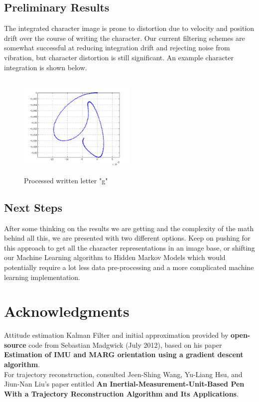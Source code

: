 \documentclass{article}
\begin{document}
\subsection{Preliminary Results}
The integrated character image is prone to distortion due to velocity and position drift over the course of writing the character. Our current filtering schemes are somewhat successful at reducing integration drift and rejecting noise from vibration, but character distortion is still significant. An example character integration is shown below.
\begin{figure}[H]
\centering
    \includegraphics[width=0.5\textwidth, height= 5cm]{g.png}
    \caption{Processed written letter "g"}
\end{figure}


\subsection{Next Steps}
After some thinking on the results we are getting and the complexity of the math behind all this, we are presented with two different options. Keep on pushing for this approach to get all the character representations in an image base, or shifting our Machine Learning algorithm to Hidden Markov Models which would potentially require a lot less data pre-processing and a more complicated machine learning implementation.
 
\section*{Acknowledgments} 
 
Attitude estimation Kalman Filter and initial approximation provided by \textbf{open-source} code from Sebastian Madgwick (July 2012), based on his paper \textbf{Estimation of IMU and MARG orientation using a gradient descent algorithm}.\\
For trajectory reconstruction, consulted Jeen-Shing Wang, Yu-Liang Hsu, and Jiun-Nan Liu's paper entitled \textbf{An Inertial-Measurement-Unit-Based Pen With a Trajectory Reconstruction Algorithm and Its Applications}.


\end{document}
